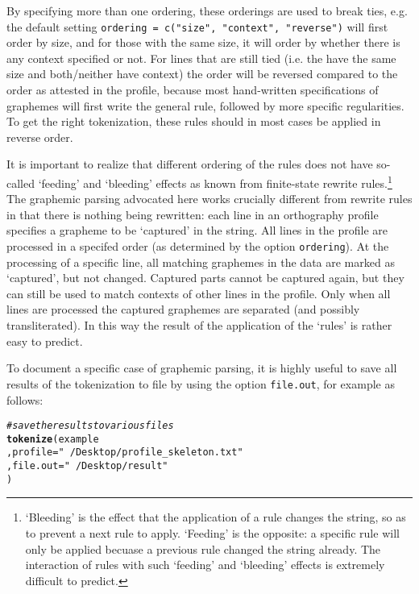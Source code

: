 \documentclass[output=inprep,
		biblatex
		]{LSP/langsci}\usepackage[]{graphicx}\usepackage[]{color}
\makeatletter
\newcommand{\hlstr}[1]{\textcolor[rgb]{0.192,0.494,0.8}{#1}}%
\newcommand{\hlcom}[1]{\textcolor[rgb]{0.678,0.584,0.686}{\textit{#1}}}%
\newcommand{\hlstd}[1]{\textcolor[rgb]{0.345,0.345,0.345}{#1}}%
\newcommand{\hlkwc}[1]{\textcolor[rgb]{0.333,0.667,0.333}{#1}}%
\newcommand{\hlkwd}[1]{\textcolor[rgb]{0.737,0.353,0.396}{\textbf{#1}}}%
\newenvironment{kframe}{%
 \def\at@end@of@kframe{}%
 \ifinner\ifhmode%
  \def\at@end@of@kframe{\end{minipage}}%
  \begin{minipage}{\columnwidth}%
 \fi\fi%
 \def\FrameCommand##1{\hskip\@totalleftmargin \hskip-\fboxsep
 \colorbox{shadecolor}{##1}\hskip-\fboxsep
     \hskip-\linewidth \hskip-\@totalleftmargin \hskip\columnwidth}%
 \MakeFramed {\advance\hsize-\width
   \@totalleftmargin\z@ \linewidth\hsize
   \@setminipage}}%
 {\par\unskip\endMakeFramed%
 \at@end@of@kframe}
\newenvironment{knitrout}{}{} %
\makeatother
\begin{document}
By specifying more than one ordering, these orderings are used to break ties,
e.g. the default setting \texttt{ordering = c("size", "context", "reverse")}
will first order by size, and for those with the same size, it will order by
whether there is any context specified or not. For lines that are still tied
(i.e. the have the same size and both/neither have context) the order will be
reversed compared to the order as attested in the profile, because most
hand-written specifications of graphemes will first write the general rule,
followed by more specific regularities. To get the right tokenization, these 
rules should in most cases be applied in reverse order.

It is important to realize that different ordering of the rules does not have
so-called `feeding' and `bleeding' effects as known from finite-state rewrite
rules.\footnote{`Bleeding' is the effect that the application of a rule changes
the string, so as to prevent a next rule to apply. `Feeding' is the opposite: a
specific rule will only be applied becuase a previous rule changed the string
already. The interaction of rules with such `feeding' and `bleeding' effects is
extremely difficult to predict.} The graphemic parsing advocated here works
crucially different from rewrite rules in that there is nothing being rewritten:
each line in an orthography profile specifies a grapheme to be `captured' in the 
string. All lines in the profile are processed in a specifed order (as determined
by the option \texttt{ordering}). At the processing of a specific line, all 
matching graphemes in the data are marked as `captured', but not changed. 
Captured parts cannot be captured again, but they can still be used to match 
contexts of other lines in the profile. Only when all lines are processed the 
captured graphemes are separated (and possibly transliterated). In this way the 
result of the application of the `rules' is rather easy to predict.

To document a specific case of graphemic parsing, it is highly useful to save
all results of the tokenization to file by using the option \texttt{file.out},
for example as follows: 

\begin{knitrout}\footnotesize
{}\color{fgcolor}\begin{kframe}
\begin{alltt}
\hlcom{# save the results to various files}
\hlkwd{tokenize}\hlstd{( example}
         \hlstd{,} \hlkwc{profile} \hlstd{=} \hlstr{"~/Desktop/profile_skeleton.txt"}
         \hlstd{,} \hlkwc{file.out} \hlstd{=} \hlstr{"~/Desktop/result"}
        \hlstd{)}
\end{alltt}
\end{kframe}
\end{knitrout}
\end{document}
